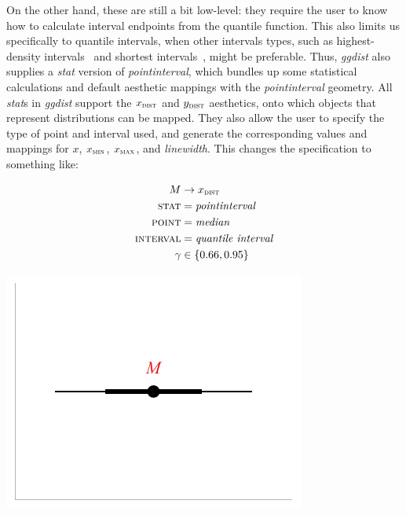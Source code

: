 \documentclass[journal]{vgtc}              %
\begin{document}
On the other hand, these are still a bit low-level: they require the user to know how to calculate interval endpoints from the quantile function. This also limits us specifically to quantile intervals, when other intervals types, such as highest-density intervals~\cite{hyndman1996computing} and shortest intervals~\cite{liu2015spi}, might be preferable. Thus, \textit{ggdist} also supplies a \textit{stat} version of \textit{pointinterval}, which bundles up some statistical calculations and default aesthetic mappings with the \textit{pointinterval} geometry. All \textit{stat}s in \textit{ggdist} support the $x_\textsc{dist}$ and $y_\textsc{dist}$ aesthetics, onto which objects that represent distributions can be mapped. They also allow the user to specify the type of point and interval used, and generate the corresponding values and mappings for $x$, $x_\textsc{min}$, $x_\textsc{max}$, and \textit{linewidth}. This changes the specification to something like:


\noindent
\begin{minipage}{.5\columnwidth}

\begin{align*}
M &\rightarrow x_\textsc{dist}\\
\textsc{stat} &= \mathit{pointinterval}\\
\textsc{point} &= \mathit{median}\\
\textsc{interval} &= \textit{quantile interval}\\
\gamma &\in \{0.66, 0.95\}
\end{align*}
\end{minipage}%
  \begin{minipage}{.4\columnwidth}
    \centering
    \includegraphics[width=1.2\columnwidth]{figs/3-stat_pointinterval_A.pdf}
  \end{minipage}
\hfill\break
\end{document}
